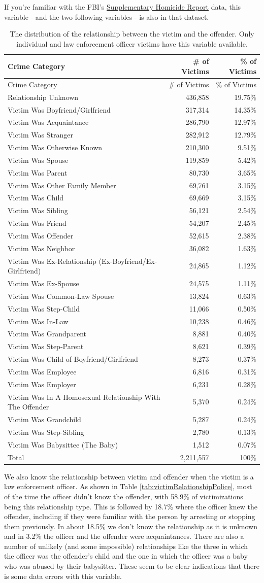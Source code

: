 \documentclass[
  12pt,
  openany]{book}
\begin{document}
If you're familiar with the FBI's \href{https://ucrbook.com/shr.html}{Supplementary Homicide Report} data, this variable - and the two following variables - is also in that dataset.

\begin{longtable}[]{@{}lrr@{}}
\caption{\label{tab:victimRelationship}The distribution of the relationship between the victim and the offender. Only individual and law enforcement officer victims have this variable available.}\tabularnewline
\toprule
Crime Category & \# of Victims & \% of Victims\tabularnewline
\midrule
\endfirsthead
\toprule
Crime Category & \# of Victims & \% of Victims\tabularnewline
\midrule
\endhead
Relationship Unknown & 436,858 & 19.75\%\tabularnewline
Victim Was Boyfriend/Girlfriend & 317,314 & 14.35\%\tabularnewline
Victim Was Acquaintance & 286,790 & 12.97\%\tabularnewline
Victim Was Stranger & 282,912 & 12.79\%\tabularnewline
Victim Was Otherwise Known & 210,300 & 9.51\%\tabularnewline
Victim Was Spouse & 119,859 & 5.42\%\tabularnewline
Victim Was Parent & 80,730 & 3.65\%\tabularnewline
Victim Was Other Family Member & 69,761 & 3.15\%\tabularnewline
Victim Was Child & 69,669 & 3.15\%\tabularnewline
Victim Was Sibling & 56,121 & 2.54\%\tabularnewline
Victim Was Friend & 54,207 & 2.45\%\tabularnewline
Victim Was Offender & 52,615 & 2.38\%\tabularnewline
Victim Was Neighbor & 36,082 & 1.63\%\tabularnewline
Victim Was Ex-Relationship (Ex-Boyfriend/Ex-Girlfriend) & 24,865 & 1.12\%\tabularnewline
Victim Was Ex-Spouse & 24,575 & 1.11\%\tabularnewline
Victim Was Common-Law Spouse & 13,824 & 0.63\%\tabularnewline
Victim Was Step-Child & 11,066 & 0.50\%\tabularnewline
Victim Was In-Law & 10,238 & 0.46\%\tabularnewline
Victim Was Grandparent & 8,881 & 0.40\%\tabularnewline
Victim Was Step-Parent & 8,621 & 0.39\%\tabularnewline
Victim Was Child of Boyfriend/Girlfriend & 8,273 & 0.37\%\tabularnewline
Victim Was Employee & 6,816 & 0.31\%\tabularnewline
Victim Was Employer & 6,231 & 0.28\%\tabularnewline
Victim Was In A Homosexual Relationship With The Offender & 5,370 & 0.24\%\tabularnewline
Victim Was Grandchild & 5,287 & 0.24\%\tabularnewline
Victim Was Step-Sibling & 2,780 & 0.13\%\tabularnewline
Victim Was Babysittee (The Baby) & 1,512 & 0.07\%\tabularnewline
Total & 2,211,557 & 100\%\tabularnewline
\bottomrule
\end{longtable}

We also know the relationship between victim and offender when the victim is a law enforcement officer. As shown in Table \ref{tab:victimRelationshipPolice}, most of the time the officer didn't know the offender, with 58.9\% of victimizations being this relationship type. This is followed by 18.7\% where the officer knew the offender, including if they were familiar with the person by arresting or stopping them previously. In about 18.5\% we don't know the relationship as it is unknown and in 3.2\% the officer and the offender were acquaintances. There are also a number of unlikely (and some impossible) relationships like the three in which the officer was the offender's child and the one in which the officer was a baby who was abused by their babysitter. These seem to be clear indications that there is some data errors with this variable.
\end{document}
